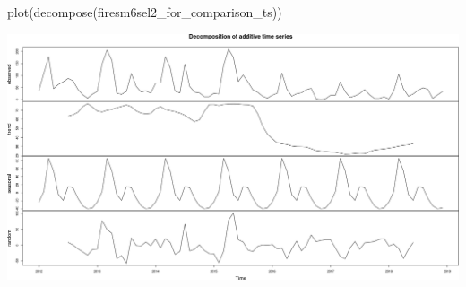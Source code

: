 \documentclass[10pt,landscape,a3paper]{article}
\newenvironment{Shaded}{\begin{snugshade}}{\end{snugshade}}
\newcommand{\FunctionTok}[1]{\textcolor[rgb]{0.00,0.00,0.00}{#1}}
\newcommand{\NormalTok}[1]{#1}
\begin{document}
\begin{Shaded}
\begin{Highlighting}[]
\FunctionTok{plot}\NormalTok{(}\FunctionTok{decompose}\NormalTok{(firesm6sel2\_for\_comparison\_ts))}
\end{Highlighting}
\end{Shaded}

\begin{center}\includegraphics[width=0.75\linewidth]{img/data-download-preparation-eda/unnamed-chunk-1-2} \end{center}
\end{document}
